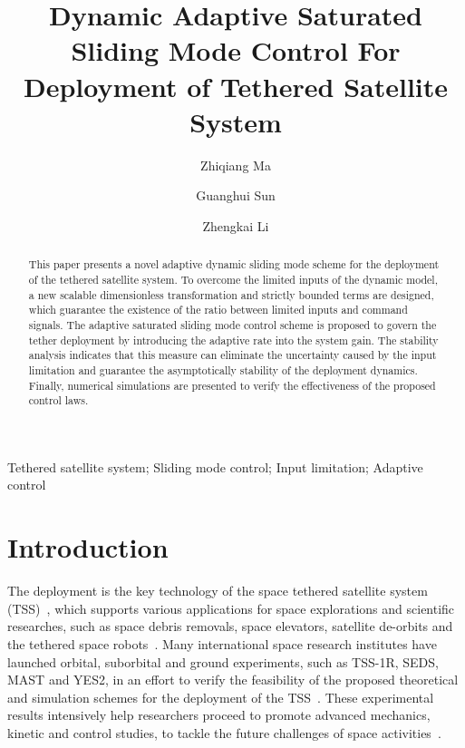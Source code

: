 \documentclass[3p]{elsarticle}
\theoremstyle{plain}
\theoremstyle{remark}
\begin{document}
\begin{frontmatter}
\title{Dynamic Adaptive Saturated Sliding Mode Control For Deployment of Tethered Satellite System}
\author{Zhiqiang Ma}
\author{Guanghui Sun}
{\author{Zhengkai Li}}
\address{Research Institute of Intelligent Control and Systems, Harbin Institute of Technology, Harbin 150001, China}



\begin{abstract}
This paper presents a novel adaptive dynamic sliding mode scheme for the deployment of the tethered satellite system. To overcome the limited inputs of the dynamic model, a new scalable dimensionless transformation and strictly bounded terms are designed, which guarantee the existence of the ratio between limited inputs and command signals. The adaptive saturated sliding mode control scheme is proposed to govern the tether deployment by introducing the adaptive rate into the system gain. The stability analysis indicates that this measure can eliminate the uncertainty caused by the input limitation and guarantee the asymptotically stability of the deployment dynamics. Finally, numerical simulations are presented to verify the effectiveness of the proposed control laws.
\end{abstract}
\begin{keyword}
Tethered satellite system;  Sliding mode control;  Input limitation; Adaptive control
\end{keyword}
\end{frontmatter}
\section{Introduction}
The deployment is the key technology of the space tethered satellite system (TSS)~\cite{wen2008advances,yousefian2015anti}, which supports various applications for space explorations and scientific researches, such as space debris removals, space elevators, satellite de-orbits and the tethered space robots~\cite{zhao2014thrust,kojima2015mission,zhong2013dynamics,zhong2013long,Huang2016Impact,Huang2016,Huang2016416,Huang2016171,Huang20161985}. Many international space research institutes have launched orbital, suborbital and ground experiments, such as TSS-1R, SEDS, MAST and YES2, in an effort to verify the feasibility of the proposed theoretical and simulation schemes for the deployment of the TSS~\cite{williams2012review,robitaille2006interpreting,stone1998tss,williams2009yes2}. These experimental results intensively help researchers proceed to promote advanced mechanics, kinetic and control studies, to tackle the future challenges of space activities~\cite{yu2016nonlinear,wen2015space,aslanov2016swing,meng2016lyapunov,zhang2015line,Xu2016Hybrid}.
\end{document}
